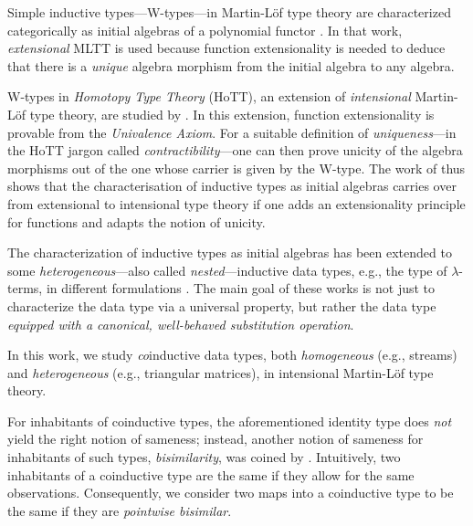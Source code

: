 \documentclass{amsart}
\begin{document}
 Simple inductive types---\textsf{W}-types---in Martin-L\"of type theory are characterized categorically as initial algebras of
 a polynomial functor \parencite{DBLP:journals/tcs/Dybjer97}. In that work, \emph{extensional} MLTT is used
 because function extensionality is needed to deduce that there is a \emph{unique} algebra morphism from the initial algebra to any algebra.
 
 \textsf{W}-types in \emph{Homotopy Type Theory} (HoTT), an extension of \emph{intensional} Martin-L\"of type theory, are studied by \textcite{DBLP:conf/lics/AwodeyGS12}.
 In this extension, function extensionality is provable from the \emph{Univalence Axiom}. 
 For a suitable definition of \emph{uniqueness}---in the HoTT jargon called \emph{contractibility}---one can then prove unicity of the
 algebra morphisms out of the one whose carrier is given by the \textsf{W}-type.
 The work of \textcite{DBLP:conf/lics/AwodeyGS12} thus shows that the characterisation of inductive types as initial algebras carries over 
 from extensional to intensional type theory if one adds an extensionality principle for functions and adapts the notion of unicity.
 
 The characterization of inductive types as initial algebras 
 has been extended to some \emph{heterogeneous}---also called \emph{nested}---inductive data types, e.g., the type of $\lambda$-terms,
 in different formulations \parencite{fpt, DBLP:journals/iandc/HirschowitzM10}.
 The main goal of these works is not just to characterize the data type via a universal property, but rather the data type
 \emph{equipped with a canonical, well-behaved substitution operation}.
 

 
 In this work, we study \emph{co}inductive data types, both \emph{homogeneous} (e.g., streams) and \emph{heterogeneous} (e.g., triangular matrices),
 in intensional Martin-L\"of type theory.
 
 For inhabitants of coinductive types, the aforementioned identity type does \emph{not} yield the right notion of sameness;
 instead, another notion of sameness for inhabitants of such types, 
 \emph{bisimilarity}, was coined by \textcite{aczel_nonwellfounded}. 
 Intuitively, two inhabitants of a coinductive type are the same if they allow for the same observations.
 Consequently, we consider two maps into a coinductive type to be the same if they are \emph{pointwise bisimilar}.
 
\end{document}
